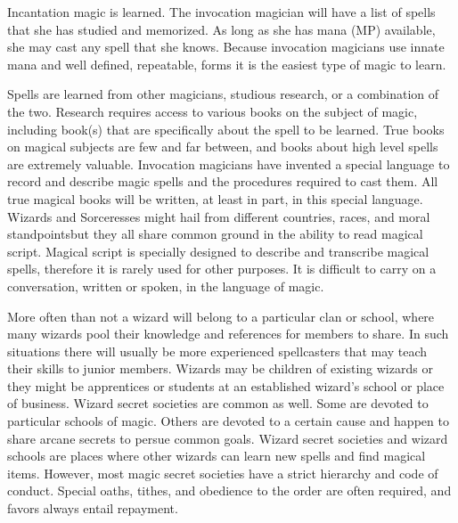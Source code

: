 \documentclass[twoside]{book}
\begin{document}
    {  
      Incantation magic is learned. The invocation
               magician will have a list of spells that she has studied
               and memorized. As long as she has mana (MP) available, she
               may cast any spell that she knows. Because invocation
               magicians use innate mana and well defined, repeatable,
               forms it is the easiest type of magic to learn. 
    }
  
    {  
      Spells are learned from other magicians, studious
               research, or a combination of the two. Research requires
               access to various books on the subject of magic, including
               book(s) that are specifically about the spell to be
               learned. True books on magical subjects are few and far
               between, and books about high level spells are extremely
               valuable. Invocation magicians have invented a special
               language to record and describe magic spells and the
               procedures required to cast them. All true magical books
               will be written, at least in part, in this special
               language. Wizards and Sorceresses might hail from
               different countries, races, and moral
               standpointsbut they all share common ground in the
               ability to read magical script. Magical script is
               specially designed to describe and transcribe magical
               spells, therefore it is rarely used for other purposes. It
               is difficult to carry on a conversation, written or
               spoken, in the language of magic. 
    }
  
    {  
      More often than not a wizard will belong to a
               particular clan or school, where many wizards pool their
               knowledge and references for members to share. In such
               situations there will usually be more experienced
               spellcasters that may teach their skills to junior
               members. Wizards may be children of existing wizards or
               they might be apprentices or students at an established
               wizard's school or place of business. Wizard secret
               societies are common as well. Some are devoted to
               particular schools of magic. Others are devoted to a
               certain cause and happen to share arcane secrets to persue
               common goals. Wizard secret societies and wizard schools
               are places where other wizards can learn new spells and
               find magical items. However, most magic secret societies
               have a strict hierarchy and code of conduct. Special
               oaths, tithes, and obedience to the order are often
               required, and favors always entail repayment. 
    }
  
\end{document}
